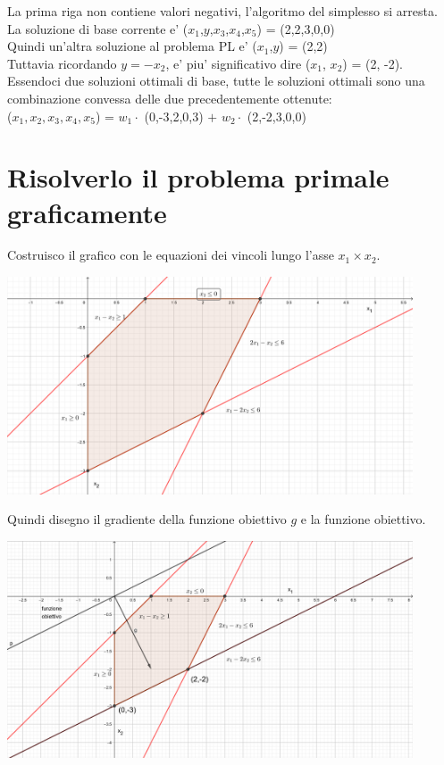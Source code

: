 \documentclass[a4paper,12pt,oneside]{article}
\begin{document}
    La prima riga non contiene valori negativi, l'algoritmo del simplesso si arresta. \\
    La soluzione di base corrente e' ($x_1$,$y$,$x_3$,$x_4$,$x_5$) = (2,2,3,0,0) \\
    Quindi un'altra soluzione al problema PL e' ($x_1$,$y$) = (2,2)\\
    Tuttavia ricordando $y = -x_2$, e' piu' significativo dire ($x_1$, $x_2$) = (2, -2). \\

    Essendoci due soluzioni ottimali di base, tutte le soluzioni ottimali sono una combinazione convessa delle due precedentemente ottenute: \\
    ($x_1, x_2, x_3, x_4, x_5$) = $w_1 \cdot $ (0,-3,2,0,3) $+$ $w_2 \cdot $ (2,-2,3,0,0)

    \newpage

    \section{Risolverlo il problema primale graficamente}

    Costruisco il grafico con le equazioni dei vincoli lungo l'asse $x_1 \times x_2$.

    \begin{center}
        \includegraphics[width=12cm]{prima-fase.png}
    \end{center}

    Quindi disegno il gradiente della funzione obiettivo $g$ e la funzione obiettivo.

    \begin{center}
        \includegraphics[width=12cm]{seconda-fase.png}
    \end{center}
\end{document}
